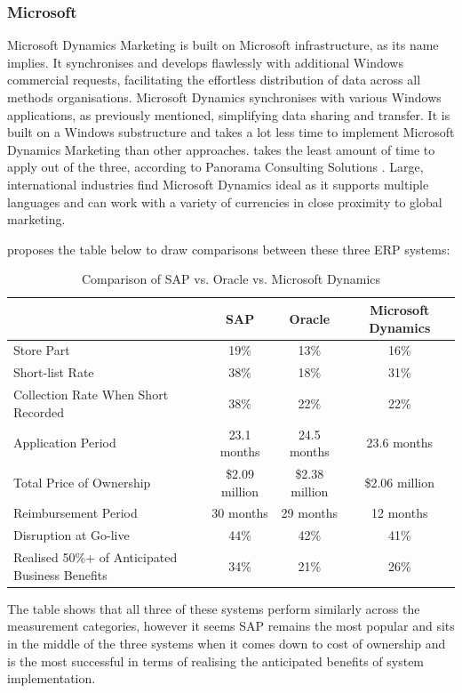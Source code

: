 \subsubsection{Microsoft}
\par{Microsoft Dynamics Marketing is built on Microsoft infrastructure, as its name implies. It synchronises and develops flawlessly with additional Windows commercial requests, facilitating the effortless distribution of data across all methods organisations. Microsoft Dynamics synchronises with various Windows applications, as previously mentioned, simplifying data sharing and transfer. It is built on a Windows substructure and takes a lot less time to implement Microsoft Dynamics Marketing than other approaches. takes the least amount of time to apply out of the three, according to Panorama Consulting Solutions \citep{solutions2016report}. Large, international industries find Microsoft Dynamics ideal as it supports multiple languages and can work with a variety of currencies in close proximity to global marketing.}
\par{\cite{mayer2017clash} proposes the table below to draw comparisons between these three ERP systems:}
\begin{table}[ht]
    \centering
    \scriptsize
    \begin{tabular}{|l|c|c|c|}
    \hline
    & \textbf{SAP} & \textbf{Oracle} & \textbf{Microsoft Dynamics} \\ \hline
    Store Part & 19\% & 13\% & 16\% \\ \hline
    Short-list Rate & 38\% & 18\% & 31\% \\ \hline
    Collection Rate When Short Recorded & 38\% & 22\% & 22\% \\ \hline
    Application Period & 23.1 months & 24.5 months & 23.6 months \\ \hline
    Total Price of Ownership & \$2.09 million & \$2.38 million & \$2.06 million \\ \hline
    Reimbursement Period & 30 months & 29 months & 12 months \\ \hline
    Disruption at Go-live & 44\% & 42\% & 41\% \\ \hline
    Realised 50\%+ of Anticipated Business Benefits & 34\% & 21\% & 26\% \\ \hline
    \end{tabular}
    \caption{Comparison of SAP vs. Oracle vs. Microsoft Dynamics}
\end{table}
\par{The table shows that all three of these systems perform similarly across the measurement categories, however it seems SAP remains the most popular and sits in the middle of the three systems when it comes down to cost of ownership and is the most successful in terms of realising the anticipated benefits of system implementation.}
